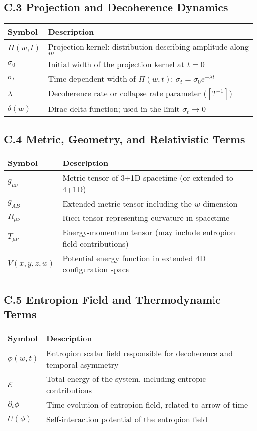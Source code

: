 \documentclass[12pt]{article}
\begin{document}
\vspace{1em}
\subsection*{C.3 Projection and Decoherence Dynamics}
\begin{longtable}{p{3cm} p{11cm}}
\toprule
\textbf{Symbol} & \textbf{Description} \\
\midrule
$\Pi(w,t)$ & Projection kernel: distribution describing amplitude along $w$ \\
$\sigma_0$ & Initial width of the projection kernel at $t = 0$ \\
$\sigma_t$ & Time-dependent width of $\Pi(w,t)$: $\sigma_t = \sigma_0 e^{-\lambda t}$ \\
$\lambda$ & Decoherence rate or collapse rate parameter ($[T^{-1}]$) \\
$\delta(w)$ & Dirac delta function; used in the limit $\sigma_t \to 0$ \\
\bottomrule
\end{longtable}

\vspace{1em}
\subsection*{C.4 Metric, Geometry, and Relativistic Terms}
\begin{longtable}{p{3cm} p{11cm}}
\toprule
\textbf{Symbol} & \textbf{Description} \\
\midrule
$g_{\mu\nu}$ & Metric tensor of 3+1D spacetime (or extended to 4+1D) \\
$g_{AB}$ & Extended metric tensor including the $w$-dimension \\
$R_{\mu\nu}$ & Ricci tensor representing curvature in spacetime \\
$T_{\mu\nu}$ & Energy-momentum tensor (may include entropion field contributions) \\
$V(x, y, z, w)$ & Potential energy function in extended 4D configuration space \\
\bottomrule
\end{longtable}

\vspace{1em}
\subsection*{C.5 Entropion Field and Thermodynamic Terms}
\begin{longtable}{p{3cm} p{11cm}}
\toprule
\textbf{Symbol} & \textbf{Description} \\
\midrule
$\phi(w,t)$ & Entropion scalar field responsible for decoherence and temporal asymmetry \\
$\mathcal{E}$ & Total energy of the system, including entropic contributions \\
$\partial_t \phi$ & Time evolution of entropion field, related to arrow of time \\
$U(\phi)$ & Self-interaction potential of the entropion field \\
\bottomrule
\end{longtable}
\end{document}
